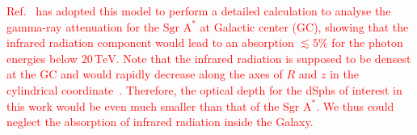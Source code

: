 \documentclass[12pt,aps,prd,amsmath,amssymb,showpacs,floats,floatfix,nofootinbib]{revtex4-1}
\def\red#1{{\textcolor{red}{#1}}} %
\def\TeV{\mathrm{TeV}} %
\begin{document}
\red{
  Ref.~\cite{Zhang:2005tp} has adopted this model to perform a detailed calculation to analyse the gamma-ray attenuation for the $\mathrm{Sgr\,\,A^*}$ at Galactic center (GC), showing that the infrared radiation component would lead to an absorption $\lesssim5\%$ for the photon energies below $20\,\TeV$.
  Note that the infrared radiation is supposed to be densest at the GC and would rapidly decrease along the axes of $R$ and $z$ in the cylindrical coordinate~\cite{Strong:1998fr}.
  Therefore, the optical depth for the dSphs of interest in this work would be even much smaller than that of the $\mathrm{Sgr\,\,A^*}$.
  We thus could neglect the absorption of infrared radiation inside the Galaxy.
}


%
%

\end{document}
